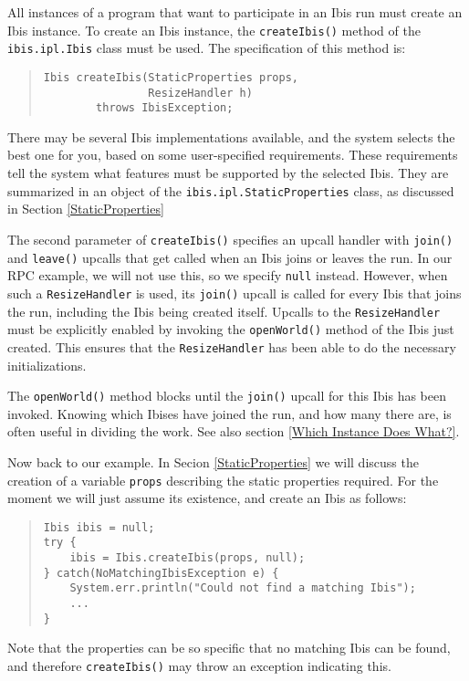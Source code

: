 \documentclass[10pt]{article}
\begin{document}
All instances of a program that want to participate in an Ibis run
must create an Ibis instance.
To create an Ibis instance, the \texttt{createIbis()} method of the
\texttt{ibis.ipl.Ibis} class must be used.
The specification of this method is:
\begin{quote}
\begin{verbatim}
Ibis createIbis(StaticProperties props,
                ResizeHandler h)
        throws IbisException;
\end{verbatim}
\end{quote}
There may be several Ibis implementations available, and
the system selects the best one for you, based on some
user-specified requirements.
These requirements tell the system what features must be supported
by the selected Ibis.
They are summarized in an object of the
\texttt{ibis.ipl.StaticProperties} class, as discussed in Section
\ref{StaticProperties}

The second parameter of \texttt{createIbis()} specifies an upcall handler
with \texttt{join()} and \texttt{leave()} upcalls that get called when an Ibis
joins or leaves the run.  In our RPC example, we will not use this, so we
specify \texttt{null} instead.  However, when such a \texttt{ResizeHandler}
is used, its \texttt{join()} upcall is called for every Ibis that joins the
run, including the Ibis being created itself.
Upcalls to the \texttt{ResizeHandler} must be explicitly enabled by
invoking the \texttt{openWorld()} method of the Ibis
just created. This ensures that the \texttt{ResizeHandler} has been
able to do the necessary initializations.

The \texttt{openWorld()} method blocks until the
\texttt{join()} upcall for this Ibis has been invoked.  Knowing which Ibises
have joined the run, and how many there are, is often useful in dividing
the work. See also section \ref{Which Instance Does What?}.

Now back to our example. In Secion \ref{StaticProperties} we will
discuss the creation of a variable \texttt{props} describing the
static properties required. For the moment we will just assume its
existence, and create an Ibis as follows:
\begin{quote}
\begin{verbatim}
Ibis ibis = null;
try {
    ibis = Ibis.createIbis(props, null);
} catch(NoMatchingIbisException e) {
    System.err.println("Could not find a matching Ibis");
    ...
}
\end{verbatim}
\end{quote}
Note that the properties can be so specific that no matching Ibis
can be found, and therefore \texttt{createIbis()} may throw an exception
indicating this.
\end{document}
